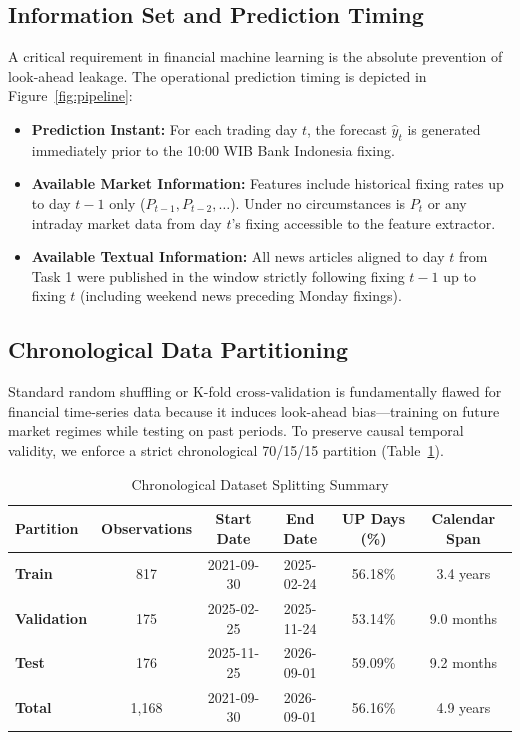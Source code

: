 \documentclass[10pt,a4paper]{article}
\begin{document}
\subsection{Information Set and Prediction Timing}
A critical requirement in financial machine learning is the absolute prevention of look-ahead leakage. The operational prediction timing is depicted in Figure~\ref{fig:pipeline}:
\begin{itemize}[leftmargin=1.5em]
    \item \textbf{Prediction Instant:} For each trading day $t$, the forecast $\hat{y}_t$ is generated immediately prior to the 10:00 WIB Bank Indonesia fixing.
    \item \textbf{Available Market Information:} Features include historical fixing rates up to day $t-1$ only ($P_{t-1}, P_{t-2}, \dots$). Under no circumstances is $P_t$ or any intraday market data from day $t$'s fixing accessible to the feature extractor.
    \item \textbf{Available Textual Information:} All news articles aligned to day $t$ from Task 1 were published in the window strictly following fixing $t-1$ up to fixing $t$ (including weekend news preceding Monday fixings).
\end{itemize}

\subsection{Chronological Data Partitioning}
Standard random shuffling or K-fold cross-validation is fundamentally flawed for financial time-series data because it induces look-ahead bias—training on future market regimes while testing on past periods. To preserve causal temporal validity, we enforce a strict chronological 70/15/15 partition (Table~\ref{tab:splits}).

\begin{table}[h]
\centering
\footnotesize
\caption{Chronological Dataset Splitting Summary}
\label{tab:splits}
\begin{tabular}{lccccc}
\toprule
\textbf{Partition} & \textbf{Observations} & \textbf{Start Date} & \textbf{End Date} & \textbf{UP Days (\%)} & \textbf{Calendar Span} \\
\midrule
\textbf{Train}      & 817 & 2021-09-30 & 2025-02-24 & 56.18\% & 3.4 years \\
\textbf{Validation} & 175 & 2025-02-25 & 2025-11-24 & 53.14\% & 9.0 months \\
\textbf{Test}       & 176 & 2025-11-25 & 2026-09-01 & 59.09\% & 9.2 months \\
\midrule
\textbf{Total}      & 1,168 & 2021-09-30 & 2026-09-01 & 56.16\% & 4.9 years \\
\bottomrule
\end{tabular}
\end{table}
\end{document}
